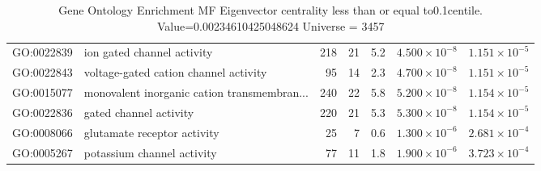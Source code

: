 \begin{table}[ht]
\begin{adjustbox}{width=\textwidth}
\begin{tabular}{llrrrrr}
  GO:0022839 & ion gated channel activity & 218 & 21 & 5.2 & $4.500 \times 10^{-8}$ & $1.151 \times 10^{-5}$ \\ 
  GO:0022843 & voltage-gated cation channel activity & 95 & 14 & 2.3 & $4.700 \times 10^{-8}$ & $1.151 \times 10^{-5}$ \\ 
  GO:0015077 & monovalent inorganic cation transmembran... & 240 & 22 & 5.8 & $5.200 \times 10^{-8}$ & $1.154 \times 10^{-5}$ \\ 
  GO:0022836 & gated channel activity & 220 & 21 & 5.3 & $5.300 \times 10^{-8}$ & $1.154 \times 10^{-5}$ \\ 
  GO:0008066 & glutamate receptor activity & 25 & 7 & 0.6 & $1.300 \times 10^{-6}$ & $2.681 \times 10^{-4}$ \\ 
  GO:0005267 & potassium channel activity & 77 & 11 & 1.8 & $1.900 \times 10^{-6}$ & $3.723 \times 10^{-4}$ \\ 
   \hline
\end{tabular}
\end{adjustbox}
\caption{Gene Ontology Enrichment MF Eigenvector centrality  less than or equal to0.1centile.   Value=0.00234610425048624 Universe = 3457} 
\label{tab:Gene Ontology Enrichment MF Eigenvector centrality  less than or equal to0.1centile.   Value=0.00234610425048624 Universe = 3457}
\end{table}

